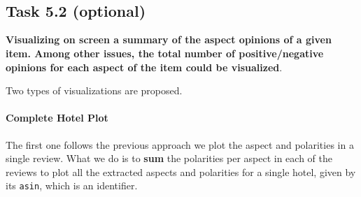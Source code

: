 \documentclass[11pt]{article}
\begin{document}
\begin{center}
\end{center}
{ \hspace*{\fill} \\}


\begin{center}
\end{center}
{ \hspace*{\fill} \\}

\hypertarget{task-5.2-optional}{%
    \subsection{Task 5.2 (optional)}\label{task-5.2-optional}}

\textbf{Visualizing on screen a summary of the aspect opinions of a
    given item. Among other issues, the total number of positive/negative
    opinions for each aspect of the item could be visualized}.

Two types of visualizations are proposed.

\hypertarget{complete-hotel-plot}{%
    \paragraph{Complete Hotel Plot}\label{complete-hotel-plot}}

The first one follows the previous approach we plot the aspect and
polarities in a single review. What we do is to \textbf{sum} the
polarities per aspect in each of the reviews to plot all the extracted
aspects and polarities for a single hotel, given by its \texttt{asin},
which is an identifier.
\end{document}
